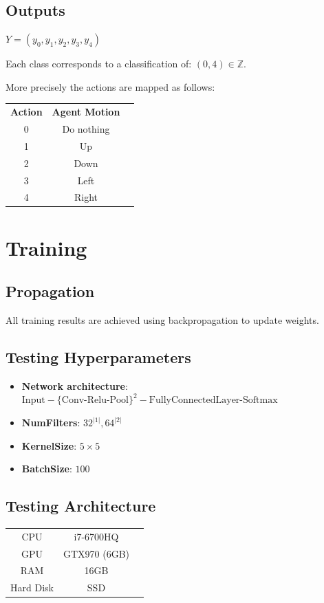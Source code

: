 \documentclass{article}
\begin{document}
\subsection{Outputs}
$Y=(y_0, y_1, y_2, y_{3}, y_{4})$

\noindent
Each class corresponds to a classification of: $(0,4) \in \mathbb{Z} $.

\noindent
More precisely the actions are mapped as follows:

\noindent
\begin{tabular}{ |c|c|c| } 
 \hline
 \textbf{Action} & \textbf{Agent Motion} \\ 
 0 & Do nothing \\ 
 1 & Up \\ 
 2 & Down\\
 3 & Left \\ 
 4 & Right\\
 \hline
\end{tabular}

\section{Training}

\subsection{Propagation}
All training results are achieved using backpropagation to update weights.

\subsection{Testing Hyperparameters}
\begin{itemize}
\item \textbf{Network architecture}: $\textrm{Input}-\{\textrm{Conv-Relu-Pool}\}^2-\textrm{FullyConnectedLayer-Softmax}$
\item \textbf{NumFilters}: $32^{|1|},64^{|2|}$
\item \textbf{KernelSize}: $5\times 5$
\item \textbf{BatchSize}: $100$
\end{itemize}

\subsection*{Testing Architecture}




\begin{tabular}{ |c|c|c| } 
 \hline
 CPU & i7-6700HQ \\ 
 GPU & GTX970 (6GB) \\ 
 RAM & 16GB \\ 
 Hard Disk & SSD\\
 \hline
\end{tabular}
\end{document}
